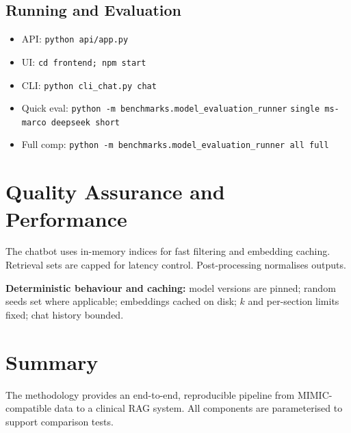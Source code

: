 \subsection{Running and Evaluation}
\begin{itemize}
  \item API: \texttt{python api/app.py}
  \item UI: \texttt{cd frontend; npm start}
  \item CLI: \texttt{python cli\_chat.py chat}
  \item Quick eval: \texttt{python -m benchmarks.model\_evaluation\_runner} \break \texttt{single ms-marco deepseek short}
  \item Full comp: \texttt{python -m benchmarks.model\_evaluation\_runner all full}
\end{itemize}

\section{Quality Assurance and Performance}
The chatbot uses in-memory indices for fast filtering and embedding caching. Retrieval sets are capped for latency control. Post-processing normalises outputs.

\noindent \textbf{Deterministic behaviour and caching:} model versions are pinned; random seeds set where applicable; embeddings cached on disk; \(k\) and per-section limits fixed; chat history bounded.


\section{Summary}
The methodology provides an end-to-end, reproducible pipeline from MIMIC-compatible data to a clinical RAG system. All components are parameterised to support comparison tests.
